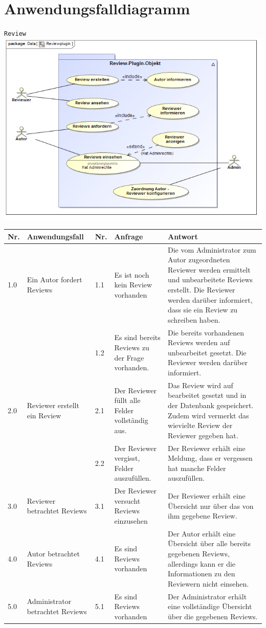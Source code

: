 \documentclass[a4paper]{scrreprt}
\begin{document}
\section{Anwendungsfalldiagramm}
\texttt{Review}\\

\includegraphics[width=1.0\textwidth]{Use_Case_Diagram__Reviewplugin.png}
\label{Review}

\begin{tabular}{|p{0.5cm}|p{3cm}|p{0.5cm}|p{4cm}|p{4.5cm}|}\hline
Nr. & Anwendungsfall & Nr. & Anfrage & Antwort\\\hline
1.0 & Ein Autor fordert Reviews & 1.1 & Es ist noch kein Review vorhanden & Die vom Administrator zum Autor zugeordneten Reviewer werden ermittelt und unbearbeitete Reviews erstellt. Die Reviewer werden darüber informiert, dass sie ein Review zu schreiben haben.\\\hline
&&1.2 & Es sind bereits Reviews zu der Frage vorhanden. & Die bereits vorhandenen Reviews werden auf unbearbeitet gesetzt. Die Reviewer werden darüber informiert.\\\hline
2.0 & Reviewer erstellt ein Review & 2.1 & Der Reviewer füllt alle Felder vollständig aus. & Das Review wird auf bearbeitet gesetzt und in der Datenbank gespeichert. Zudem wird vermerkt das wievielte Review der Reviewer gegeben hat.\\\hline
&&2.2 & Der Reviewer vergisst, Felder auszufüllen. & Der Reviewer erhält eine Meldung, dass er vergessen hat manche Felder auszufüllen. \\\hline
3.0 & Reviewer betrachtet Reviews & 3.1 & Der Reviewer versucht Reviews einzusehen & Der Reviewer erhält eine Übersicht nur über das von ihm gegebene Review. \\\hline
4.0 & Autor betrachtet Reviews & 4.1 & Es sind Reviews vorhanden & Der Autor erhält eine Übersicht über alle bereits gegebenen Reviews, allerdings kann er die Informationen zu den Reviewern nicht einsehen. \\\hline
5.0 & Administrator betrachtet Reviews & 5.1 & Es sind Reviews vorhanden & Der Administrator erhält eine vollständige Übersicht über die gegebenen Reviews. \\\hline
\end{tabular}
 
\end{document}
